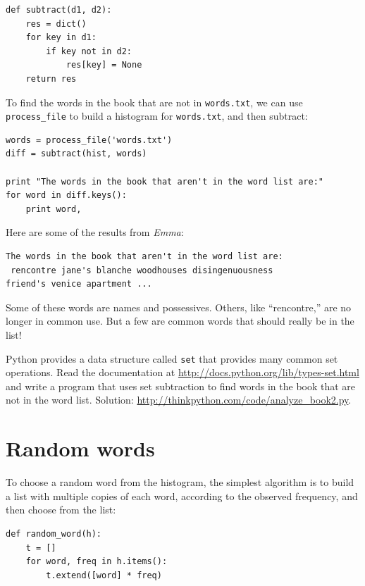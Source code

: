 \documentclass[10pt]{book}
\begin{document}
\begin{CJK}{UTF8}{gbsn}
\begin{verbatim}
def subtract(d1, d2):
    res = dict()
    for key in d1:
        if key not in d2:
            res[key] = None
    return res
\end{verbatim}
%
To find the words in the book that are not in {\tt words.txt},
we can use \verb"process_file" to build a histogram for
{\tt words.txt}, and then subtract:

\begin{verbatim}
words = process_file('words.txt')
diff = subtract(hist, words)

print "The words in the book that aren't in the word list are:"
for word in diff.keys():
    print word,
\end{verbatim}
%
Here are some of the results from {\em Emma}:

\begin{verbatim}
The words in the book that aren't in the word list are:
 rencontre jane's blanche woodhouses disingenuousness 
friend's venice apartment ...
\end{verbatim}
%
Some of these words are names and possessives.  Others, like
``rencontre,'' are no longer in common use.  But a few are common
words that should really be in the list!

\begin{exercise}

Python provides a data structure called {\tt set} that provides many
common set operations.  Read the documentation at
\url{http://docs.python.org/lib/types-set.html} and write a program
that uses set subtraction to find words in the book that are not in
the word list.  Solution: \url{http://thinkpython.com/code/analyze_book2.py}.

\end{exercise}


\section{Random words}
\label{randomwords}

To choose a random word from the histogram, the simplest algorithm
is to build a list with multiple copies of each word, according
to the observed frequency, and then choose from the list:

\begin{verbatim}
def random_word(h):
    t = []
    for word, freq in h.items():
        t.extend([word] * freq)


\end{verbatim}
\end{CJK}
\end{document}
